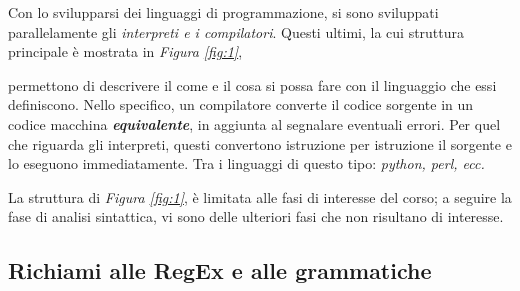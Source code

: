 \documentclass{subfiles}
\begin{document}
Con lo svilupparsi dei linguaggi di programmazione, si sono sviluppati parallelamente gli \emph{interpreti \emph{e i} compilatori}.
Questi ultimi, la cui struttura principale è mostrata in \emph{Figura \ref{fig:1}},

permettono di descrivere il come e il cosa si possa fare con il linguaggio che essi definiscono.
Nello specifico, un compilatore converte il codice sorgente in un codice macchina \emph\textbf{equivalente},
in aggiunta al segnalare eventuali errori.
Per quel che riguarda gli interpreti, questi convertono istruzione per istruzione il sorgente e lo eseguono immediatamente.
Tra i linguaggi di questo tipo: \emph{python, perl, ecc.}

\begin{Remark*}
    La struttura di \emph{Figura \ref{fig:1}}, è limitata alle fasi di interesse del corso; a seguire la fase di analisi sintattica,
    vi sono delle ulteriori fasi che non risultano di interesse.
\end{Remark*}

\subsection{Richiami alle RegEx e alle grammatiche}

\end{document}
